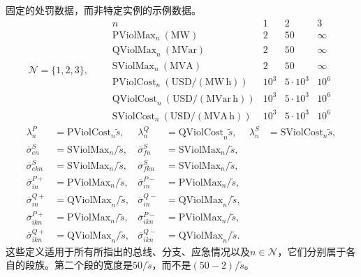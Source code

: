 \documentclass{article}
\begin{document}
固定的处罚数据，而非特定实例的示例数据。
\[
\mathcal N=\{1,2,3\},\qquad
\begin{array}{c|rrr}
 n&1&2&3\\\hline
\mathrm{PViolMax}_n\ (\mathrm{MW})&2&50&\infty\\
\mathrm{QViolMax}_n\ (\mathrm{MVar})&2&50&\infty\\
\mathrm{SViolMax}_n\ (\mathrm{MVA})&2&50&\infty\\
\mathrm{PViolCost}_n\ (\mathrm{USD}/(\mathrm{MW}\,\mathrm h))&10^3&5\cdot10^3&10^6\\
\mathrm{QViolCost}_n\ (\mathrm{USD}/(\mathrm{MVar}\,\mathrm h))&10^3&5\cdot10^3&10^6\\
\mathrm{SViolCost}_n\ (\mathrm{USD}/(\mathrm{MVA}\,\mathrm h))&10^3&5\cdot10^3&10^6
\end{array}
\]
\begin{align*}
\lambda_n^P&=\mathrm{PViolCost}_n\widetilde s,&
\lambda_n^Q&=\mathrm{QViolCost}_n\widetilde s,&
\lambda_n^S&=\mathrm{SViolCost}_n\widetilde s,\\
\overline\sigma_{en}^S&=\mathrm{SViolMax}_n/\widetilde s,&
\overline\sigma_{fn}^S&=\mathrm{SViolMax}_n/\widetilde s,\\
\overline\sigma_{ekn}^S&=\mathrm{SViolMax}_n/\widetilde s,&
\overline\sigma_{fkn}^S&=\mathrm{SViolMax}_n/\widetilde s,\\
\overline\sigma_{in}^{P+}&=\mathrm{PViolMax}_n/\widetilde s,&
\overline\sigma_{in}^{P-}&=\mathrm{PViolMax}_n/\widetilde s,\\
\overline\sigma_{in}^{Q+}&=\mathrm{QViolMax}_n/\widetilde s,&
\overline\sigma_{in}^{Q-}&=\mathrm{QViolMax}_n/\widetilde s,\\
\overline\sigma_{ikn}^{P+}&=\mathrm{PViolMax}_n/\widetilde s,&
\overline\sigma_{ikn}^{P-}&=\mathrm{PViolMax}_n/\widetilde s,\\
\overline\sigma_{ikn}^{Q+}&=\mathrm{QViolMax}_n/\widetilde s,&
\overline\sigma_{ikn}^{Q-}&=\mathrm{QViolMax}_n/\widetilde s.
\end{align*}
这些定义适用于所有所指出的总线、分支、应急情况以及$n\in\mathcal N$，它们分别属于各自的段族。第二个段的宽度是$50/\widetilde s$，而不是$(50-2)/\widetilde s$。
\end{document}
